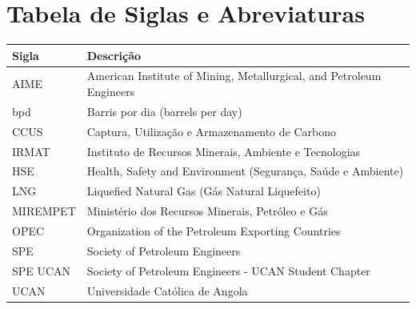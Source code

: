 \documentclass[12pt]{article}
\begin{document}
\newpage

\section*{Tabela de Siglas e Abreviaturas}

\begin{center}
\begin{longtable}{|p{3cm}|p{9cm}|}
\hline
\textbf{Sigla} & \textbf{Descrição} \\
\hline
AIME & American Institute of Mining, Metallurgical, and Petroleum Engineers \\
\hline
bpd & Barris por dia (barrels per day) \\
\hline
CCUS & Captura, Utilização e Armazenamento de Carbono \\
\hline
IRMAT & Instituto de Recursos Minerais, Ambiente e Tecnologias \\
\hline
HSE & Health, Safety and Environment (Segurança, Saúde e Ambiente) \\
\hline
LNG & Liquefied Natural Gas (Gás Natural Liquefeito) \\
\hline
MIREMPET & Ministério dos Recursos Minerais, Petróleo e Gás \\
\hline
OPEC & Organization of the Petroleum Exporting Countries \\
\hline
SPE & Society of Petroleum Engineers \\
\hline
SPE UCAN & Society of Petroleum Engineers - UCAN Student Chapter \\
\hline
UCAN & Universidade Católica de Angola \\
\hline
\end{longtable}
\end{center}
\end{document}
